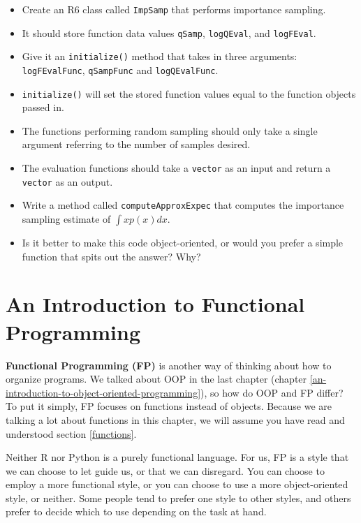 \documentclass[
  12pt,
  krantz2]{krantz}
\providecommand{\tightlist}{%
  \setlength{\itemsep}{0pt}\setlength{\parskip}{0pt}}
\begin{document}
\begin{itemize}
\tightlist
\item
  Create an R6 class called \texttt{ImpSamp} that performs importance sampling.
\item
  It should store function data values \texttt{qSamp}, \texttt{logQEval}, and \texttt{logFEval}.
\item
  Give it an \texttt{initialize()} method that takes in three arguments: \texttt{logFEvalFunc}, \texttt{qSampFunc} and \texttt{logQEvalFunc}.
\item
  \texttt{initialize()} will set the stored function values equal to the function objects passed in.
\item
  The functions performing random sampling should only take a single argument referring to the number of samples desired.
\item
  The evaluation functions should take a \texttt{vector} as an input and return a \texttt{vector} as an output.
\item
  Write a method called \texttt{computeApproxExpec} that computes the importance sampling estimate of \(\int x p(x) dx\).
\item
  Is it better to make this code object-oriented, or would you prefer a simple function that spits out the answer? Why?
\end{itemize}

\hypertarget{an-introduction-to-functional-programming}{%
\chapter{An Introduction to Functional Programming}\label{an-introduction-to-functional-programming}}

\textbf{Functional Programming (FP)} is another way of thinking about how to organize programs. We talked about OOP in the last chapter (chapter \ref{an-introduction-to-object-oriented-programming}), so how do OOP and FP differ? To put it simply, FP focuses on functions instead of objects. Because we are talking a lot about functions in this chapter, we will assume you have read and understood section \ref{functions}.

Neither R nor Python is a purely functional language. For us, FP is a style that we can choose to let guide us, or that we can disregard. You can choose to employ a more functional style, or you can choose to use a more object-oriented style, or neither. Some people tend to prefer one style to other styles, and others prefer to decide which to use depending on the task at hand.
\end{document}
